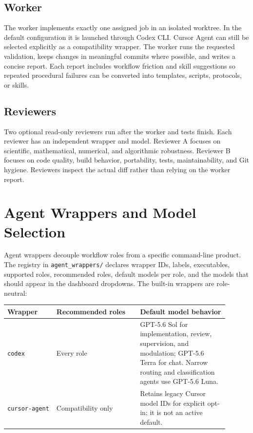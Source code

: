 \documentclass[11pt]{article}
\renewcommand{\path}[1]{\texttt{#1}}
\begin{document}
\subsection{Worker}

The worker implements exactly one assigned job in an isolated worktree.  In the
default configuration it is launched through Codex CLI.  Cursor Agent can still be
selected explicitly as a compatibility wrapper.  The worker runs the requested validation,
keeps changes in meaningful commits where possible, and writes a concise report.
Each report includes workflow friction and skill suggestions so repeated
procedural failures can be converted into templates, scripts, protocols, or
skills.

\subsection{Reviewers}

Two optional read-only reviewers run after the worker and tests finish.  Each
reviewer has an independent wrapper and model.  Reviewer A focuses on
scientific, mathematical, numerical, and algorithmic robustness.  Reviewer B
focuses on code quality, build behavior, portability, tests, maintainability,
and Git hygiene.  Reviewers inspect the actual diff rather than relying on the
worker report.

\section{Agent Wrappers and Model Selection}

Agent wrappers decouple workflow roles from a specific command-line product.
The registry in \path{agent\_wrappers/} declares wrapper IDs, labels,
executables, supported roles, recommended roles, default models per role, and
the models that should appear in the dashboard dropdowns.  The built-in wrappers
are role-neutral:

\begin{longtable}{p{0.20\linewidth}p{0.34\linewidth}p{0.36\linewidth}}
\textbf{Wrapper} & \textbf{Recommended roles} & \textbf{Default model behavior}\\
\hline
\path{codex} & Every role & GPT-5.6 Sol for implementation, review, supervision, and modulation; GPT-5.6 Terra for chat.  Narrow routing and classification agents use GPT-5.6 Luna.\\
\path{cursor-agent} & Compatibility only & Retains legacy Cursor model IDs for explicit opt-in; it is not an active default.\\
\end{longtable}
\end{document}
